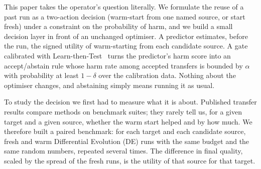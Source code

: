 \documentclass[11pt]{article}
\begin{document}
This paper takes the operator's question literally. We formulate the reuse of a past run as a two-action decision
(warm-start from one named source, or start fresh) under a constraint on the probability of harm, and we build a
small decision layer in front of an unchanged optimiser. A predictor estimates, before the run, the signed utility
of warm-starting from each candidate source. A gate calibrated with Learn-then-Test~\citep{angelopoulos2025ltt}
turns the predictor's harm score into an accept/abstain rule whose harm rate among accepted transfers is bounded by
$\alpha$ with probability at least $1-\delta$ over the calibration data. Nothing about the optimiser changes, and
abstaining simply means running it as usual.

To study the decision we first had to measure what it is about. Published transfer results compare methods on
benchmark suites; they rarely tell us, for a given target and a given source, whether the warm start helped and by
how much. We therefore built a paired benchmark: for each target and each candidate source, fresh and warm
Differential Evolution (DE) runs with the same budget and the same random numbers, repeated several times. The
difference in final quality, scaled by the spread of the fresh runs, is the utility of that source for that target.
\end{document}
